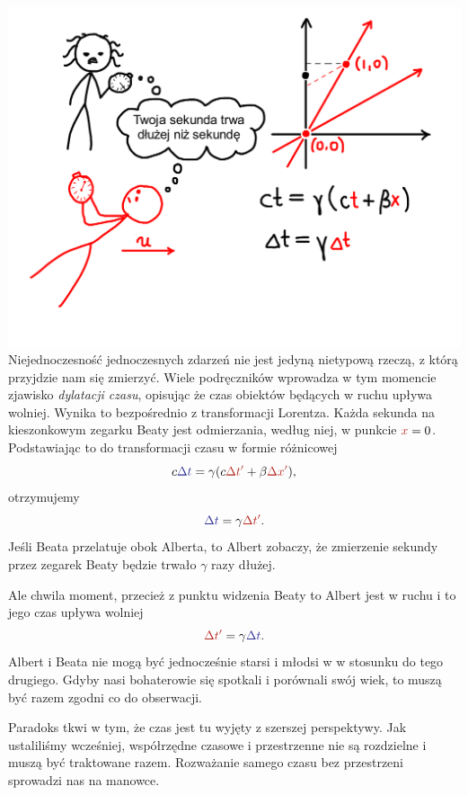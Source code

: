 \documentclass[10pt,twocolumn,fleqn,polish]{article}
\providecommand{\mathcolor}[2]{{\color{#1}#2}}
\newcommand{\mred}[1]{\mathcolor{BrickRed}{#1}}
\newcommand{\mblue}[1]{\mathcolor{Blue}{#1}}
\begin{document}
\noindent\includegraphics[width=1\linewidth]{pages/STA-page25}
Niejednoczesność jednoczesnych zdarzeń nie jest jedyną nietypową rzeczą,
z którą przyjdzie nam się zmierzyć. Wiele podręczników wprowadza w tym
momencie zjawisko \textit{dylatacji czasu}, opisując że czas obiektów będących w
ruchu upływa wolniej. Wynika to bezpośrednio z transformacji Lorentza.
Każda sekunda na kieszonkowym zegarku Beaty jest odmierzania, według niej,
w punkcie $\mred{x} = 0$. Podstawiając to do transformacji czasu w formie
różnicowej
\[c\mblue{\Delta t} = \gamma (c\mred{\Delta t'} + \beta \mred{\Delta x'}),\]
otrzymujemy
\[\mblue{\Delta t} = \gamma \mred{\Delta t'}.\]
Jeśli Beata przelatuje obok Alberta, to Albert zobaczy, że zmierzenie sekundy
przez zegarek Beaty będzie trwało $\gamma$ razy dłużej.

Ale chwila moment, przecież z punktu widzenia Beaty to Albert jest w ruchu
i to jego czas upływa wolniej
\[\mred{\Delta t'} = \gamma \mblue{\Delta t}.\]
Albert i Beata nie mogą być jednocześnie starsi i młodsi w
w stosunku do tego drugiego. Gdyby nasi bohaterowie się spotkali i
porównali swój wiek, to muszą być razem zgodni co do obserwacji.

Paradoks tkwi w tym, że czas jest tu wyjęty z szerszej perspektywy.
Jak ustaliliśmy wcześniej, współrzędne czasowe i przestrzenne nie są
rozdzielne i muszą być traktowane razem. Rozważanie samego czasu bez
przestrzeni sprowadzi nas na manowce.
\end{document}
